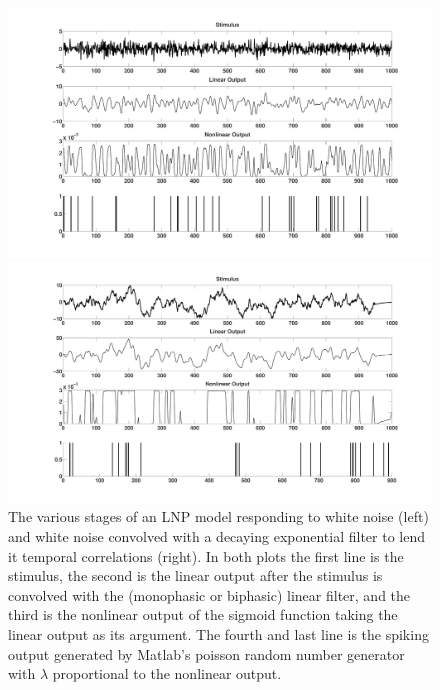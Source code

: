\documentclass[12pt]{article}
\begin{document}
\begin{figure}[h!!]
\centering
\begin{minipage}[b]{0.48\linewidth}
\centering
\includegraphics[width=\textwidth]{lnp_white.pdf}
\end{minipage}
\begin{minipage}[b]{0.48\linewidth}
\centering
\includegraphics[width=\textwidth]{lnp_pink.pdf}
\end{minipage}
\caption{The various stages of an LNP model responding to white noise (left) and white noise convolved with a decaying exponential filter to lend it temporal correlations (right).  In both plots the first line is the stimulus, the second is the linear output after the stimulus is convolved with the (monophasic or biphasic) linear filter, and the third is the nonlinear output of the sigmoid function taking the linear output as its argument.  The fourth and last line is the spiking output generated by Matlab's poisson random number generator with $\lambda$ proportional to the nonlinear output.}
\label{Figure 6}
\end{figure}
\end{document}
